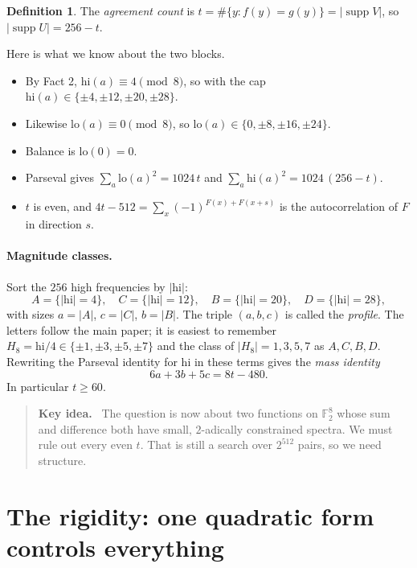 \documentclass[11pt]{article}
\theoremstyle{definition}
\newtheorem{definition}[theorem]{Definition}
\theoremstyle{remark}
\newcommand{\F}{\mathbb{F}}
\newcommand{\supp}{\operatorname{supp}}
\newcommand{\lo}{\mathrm{lo}}
\newcommand{\hi}{\mathrm{hi}}
\DeclareRobustCommand{\_}{\textunderscore\allowbreak}
\newenvironment{keyidea}{\begin{quote}\small\textbf{Key idea.}\ }{\end{quote}}
\begin{document}
\begin{definition}
The \emph{agreement count} is $t=\#\{y: f(y)=g(y)\}=|\supp V|$, so $|\supp U|=256-t$.
\end{definition}

Here is what we know about the two blocks.
\begin{itemize}[nosep]
  \item By Fact 2, $\hi(a)\equiv4\pmod 8$, so with the cap $\hi(a)\in\{\pm4,\pm12,\pm20,\pm28\}$.
  \item Likewise $\lo(a)\equiv0\pmod 8$, so $\lo(a)\in\{0,\pm8,\pm16,\pm24\}$.
  \item Balance is $\lo(0)=0$.
  \item Parseval gives $\sum_a\lo(a)^2=1024\,t$ and $\sum_a\hi(a)^2=1024\,(256-t)$.
  \item $t$ is even, and $4t-512=\sum_x(-1)^{F(x)+F(x+s)}$ is the autocorrelation of $F$ in direction $s$.
\end{itemize}

\paragraph{Magnitude classes.} Sort the $256$ high frequencies by $|\hi|$:
\[
  A=\{|\hi|=4\},\quad C=\{|\hi|=12\},\quad B=\{|\hi|=20\},\quad D=\{|\hi|=28\},
\]
with sizes $a=|A|$, $c=|C|$, $b=|B|$. The triple $(a,b,c)$ is called the \emph{profile}. The letters follow the main paper; it is easiest to remember $H_8=\hi/4\in\{\pm1,\pm3,\pm5,\pm7\}$ and the class of $|H_8|=1,3,5,7$ as $A,C,B,D$. Rewriting the Parseval identity for $\hi$ in these terms gives the \emph{mass identity}
\begin{equation}\label{eq:mass}
  6a+3b+5c=8t-480 .
\end{equation}
In particular $t\ge60$.

\begin{keyidea}
The question is now about two functions on $\F_2^8$ whose sum and difference both have small, $2$-adically constrained spectra. We must rule out every even $t$. That is still a search over $2^{512}$ pairs, so we need structure.
\end{keyidea}

\section{The rigidity: one quadratic form controls everything}
\label{sec:quadratic}
\end{document}
